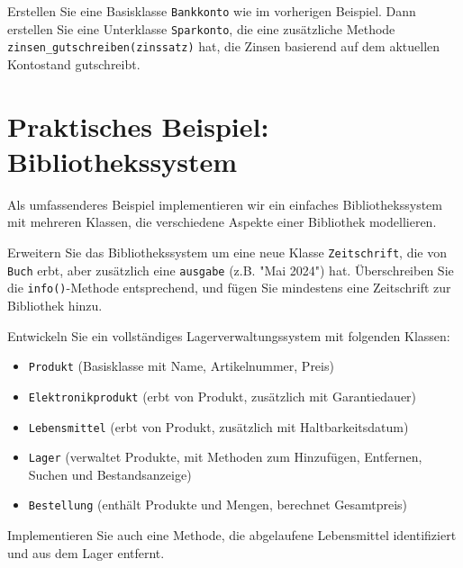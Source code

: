\begin{myexercise}
    Erstellen Sie eine Basisklasse \lstinline|Bankkonto| wie im vorherigen Beispiel. Dann erstellen Sie eine Unterklasse \lstinline|Sparkonto|, die eine zusätzliche Methode \lstinline|zinsen_gutschreiben(zinssatz)| hat, die Zinsen basierend auf dem aktuellen Kontostand gutschreibt.

    \begin{myanswer}
        
    \end{myanswer}
\end{myexercise}

\section{Praktisches Beispiel: Bibliothekssystem}

Als umfassenderes Beispiel implementieren wir ein einfaches Bibliothekssystem mit mehreren Klassen, die verschiedene Aspekte einer Bibliothek modellieren.

\begin{myexample}[Bibliothekssystem]

\end{myexample}

\begin{myexercise}
    Erweitern Sie das Bibliothekssystem um eine neue Klasse \lstinline|Zeitschrift|, die von \lstinline|Buch| erbt, aber zusätzlich eine \lstinline|ausgabe| (z.B. "Mai 2024") hat. Überschreiben Sie die \lstinline|info()|-Methode entsprechend, und fügen Sie mindestens eine Zeitschrift zur Bibliothek hinzu.

    \begin{myanswer}

    \end{myanswer}
\end{myexercise}

\begin{mychallenge}
    Entwickeln Sie ein vollständiges Lagerverwaltungssystem mit folgenden Klassen:
    \begin{itemize}
        \item \lstinline|Produkt| (Basisklasse mit Name, Artikelnummer, Preis)
        \item \lstinline|Elektronikprodukt| (erbt von Produkt, zusätzlich mit Garantiedauer)
        \item \lstinline|Lebensmittel| (erbt von Produkt, zusätzlich mit Haltbarkeitsdatum)
        \item \lstinline|Lager| (verwaltet Produkte, mit Methoden zum Hinzufügen, Entfernen, Suchen und Bestandsanzeige)
        \item \lstinline|Bestellung| (enthält Produkte und Mengen, berechnet Gesamtpreis)
    \end{itemize}

    Implementieren Sie auch eine Methode, die abgelaufene Lebensmittel identifiziert und aus dem Lager entfernt.
\end{mychallenge}

